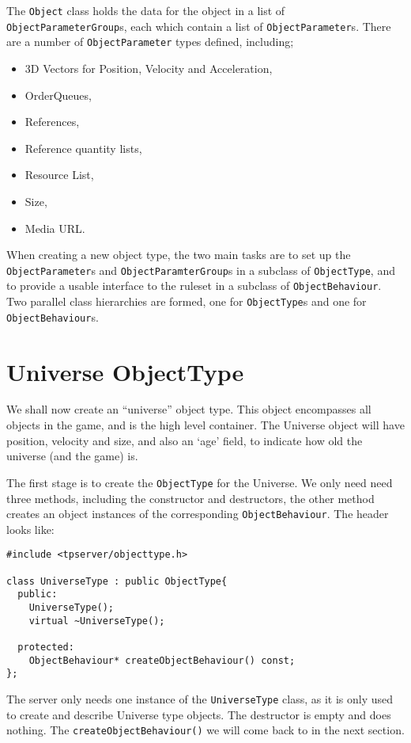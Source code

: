 \documentclass[a4paper,11pt]{report}
\newcommand{\codename}[1]{\texttt{#1}}
\begin{document}
The \codename{Object} class holds the data for the object in a list of \codename{ObjectParameterGroup}s, each which contain a list of \codename{ObjectParameter}s. There are a number of \codename{ObjectParameter} types defined, including;
\begin{itemize}
\item 3D Vectors for Position, Velocity and Acceleration,
\item OrderQueues,
\item References,
\item Reference quantity lists,
\item Resource List,
\item Size,
\item Media URL.
\end{itemize}

When creating a new object type, the two main tasks are to set up the \codename{ObjectParameter}s and \codename{ObjectParamterGroup}s in a subclass of \codename{ObjectType}, and to provide a usable interface to the ruleset in a subclass of \codename{ObjectBehaviour}. Two parallel class hierarchies are formed, one for \codename{ObjectType}s and one for \codename{ObjectBehaviour}s.

\section{Universe ObjectType}

We shall now create an ``universe'' object type. This object encompasses all objects in the game, and is the high level container. The Universe object will have position, velocity and size, and also an `age' field, to indicate how old the universe (and the game) is.

The first stage is to create the \codename{ObjectType} for the Universe. We only need need three methods, including the constructor and destructors, the other method creates an object instances of the corresponding \codename{ObjectBehaviour}. The header looks like:

\begin{verbatim}
#include <tpserver/objecttype.h>

class UniverseType : public ObjectType{
  public:
    UniverseType();
    virtual ~UniverseType();
  
  protected:
    ObjectBehaviour* createObjectBehaviour() const;
};
\end{verbatim}

The server only needs one instance of the \codename{UniverseType} class, as it is only used to create and describe Universe type objects. The destructor is empty and does nothing. The \codename{createObjectBehaviour()} we will come back to in the next section.
\end{document}
